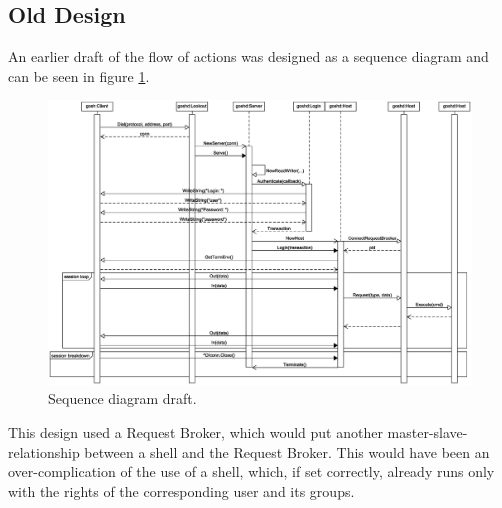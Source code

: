 \documentclass[10pt,a4paper,titlepage,twoside,english,final]{zhawreprt}
\begin{document}
\subsection{Old Design}\label{ssec:OldDesign}
An earlier draft of the flow of actions was designed as a sequence diagram and can be seen in figure \ref{fig:SeqDiaOriginal}.
\begin{figure}[ht]
\includegraphics[width=\textwidth]{SequenceDiagram}
\caption{Sequence diagram draft.}
\label{fig:SeqDiaOriginal}
\end{figure}

This design used a \gls{Request Broker}, which would put another master-slave-relationship between a \gls{shell} and the \gls{Request Broker}. This would have been an over-complication of the use of a \gls{shell}, which, if set correctly, already runs only with the rights of the corresponding user and its groups.
\end{document}
